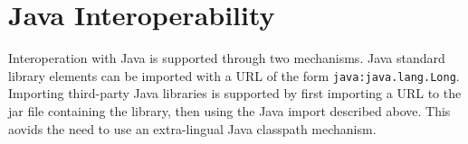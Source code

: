 \documentclass[11pt]{article}
\newcommand{\keyw}[1]{\textbf{#1}}
\newcommand{\cut}[1]{}
\begin{document}
\begin{sloppypar}
\cut{
\begin{figure}
\centering
\[
\begin{array}{lll}
e    & \bnfdef & \ldots \\
     & \bnfalt & 'dsl' \\
\\[1ex]
\tau & \bnfdef & t\\
     & \bnfdef & \tau.t\\
     & \bnfalt & \tau \rightarrow \tau \\
\\[1ex]
\end{array}
\begin{array}{lll}
~~~~
\end{array}
\begin{array}{lll}	 
d    & \bnfdef & \keyw{var}~ f:\tau = e \\
     & \bnfalt & \keyw{def}~ m:\tau = e \\
     & \bnfalt & \keyw{type}~ t~ = \{ \overline{\tau_d}, \keyw{metaobject}=e \} \\
     & \bnfalt & \keyw{type}~ t~ = \{ \tau \}  \\
\\[1ex]
\tau_d   & \bnfdef & \keyw{def}~ m:\tau \\
\\[1ex]
\sigma & \bnfdef & \tau \\
       & \bnfalt & \{ \overline{\sigma_d} \} \\
\\[1ex]
\sigma_d & \bnfdef & \keyw{var}~ f:\tau \\
         & \bnfalt & \tau_d \\
\end{array}
\]
\caption{Featherweight Wyvern Metaobject Syntax}
\label{fig:meta-syntax}
\end{figure}
}
\section{Java Interoperability}

Interoperation with Java is supported through two mechanisms.  Java standard library elements can be imported with a URL of the form \texttt{java:java.lang.Long}.  Importing third-party Java libraries is supported by first importing a URL to the jar file containing the library, then using the Java import described above.  This aovids the need to use an extra-lingual Java classpath mechanism.

\end{sloppypar}
\end{document}

